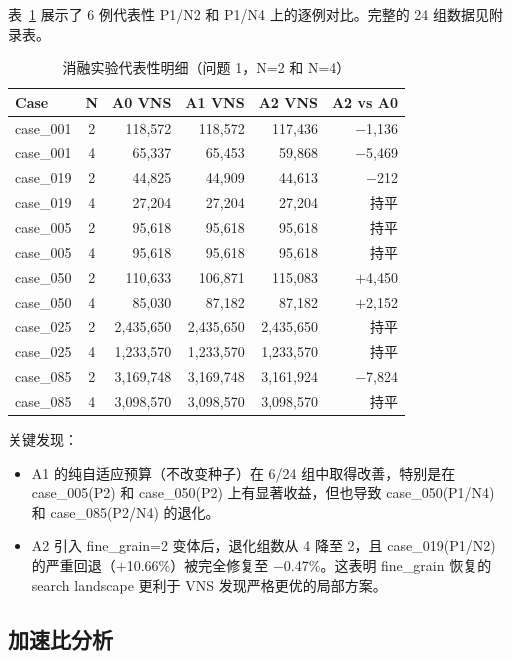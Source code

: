 \documentclass[bwprint]{gmcmthesis}
\begin{document}
表~\ref{tab:ablation_detail} 展示了 6 例代表性 P1/N2 和 P1/N4 上的逐例对比。完整的 24 组数据见附录表。

\begin{table}[!h]
\centering
\caption{消融实验代表性明细（问题 1，N=2 和 N=4）}
\label{tab:ablation_detail}
\small
\begin{tabular}{l c rrr r}
\toprule
\textbf{Case} & \textbf{N} & \textbf{A0 VNS} & \textbf{A1 VNS} & \textbf{A2 VNS} & \textbf{A2 vs A0} \\
\midrule
case\_001 & 2 & 118,572 & 118,572 & 117,436 & $-$1,136 \\
case\_001 & 4 &  65,337 &  65,453 &  59,868 & $-$5,469 \\
case\_019 & 2 &  44,825 &  44,909 &  44,613 & $-$212 \\
case\_019 & 4 &  27,204 &  27,204 &  27,204 & 持平 \\
case\_005 & 2 &  95,618 &  95,618 &  95,618 & 持平 \\
case\_005 & 4 &  95,618 &  95,618 &  95,618 & 持平 \\
case\_050 & 2 & 110,633 & 106,871 & 115,083 & $+$4,450 \\
case\_050 & 4 &  85,030 &  87,182 &  87,182 & $+$2,152 \\
case\_025 & 2 & 2,435,650 & 2,435,650 & 2,435,650 & 持平 \\
case\_025 & 4 & 1,233,570 & 1,233,570 & 1,233,570 & 持平 \\
case\_085 & 2 & 3,169,748 & 3,169,748 & 3,161,924 & $-$7,824 \\
case\_085 & 4 & 3,098,570 & 3,098,570 & 3,098,570 & 持平 \\
\bottomrule
\end{tabular}
\end{table}

关键发现：
\begin{itemize}
  \item A1 的纯自适应预算（不改变种子）在 6/24 组中取得改善，特别是在 case\_005(P2) 和 case\_050(P2) 上有显著收益，但也导致 case\_050(P1/N4) 和 case\_085(P2/N4) 的退化。
  \item A2 引入 fine\_grain=2 变体后，退化组数从 4 降至 2，且 case\_019(P1/N2) 的严重回退（$+$10.66\%）被完全修复至 $-$0.47\%。这表明 fine\_grain 恢复的 search landscape 更利于 VNS 发现严格更优的局部方案。
\end{itemize}

\subsection{加速比分析}
\end{document}
